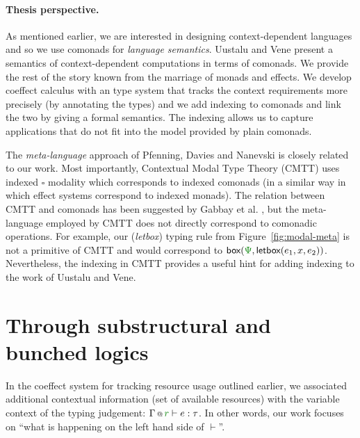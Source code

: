   
\paragraph{Thesis perspective.}
As mentioned earlier, we are interested in designing context-dependent languages and so we
use comonads for \emph{language semantics}. Uustalu and Vene present a semantics of 
context-dependent computations in terms of comonads. We provide the rest of the story known 
from the marriage of monads and effects. We develop coeffect calculus with an type system that 
tracks the context requirements more precisely (by annotating the types) and we add indexing 
to comonads and link the two by giving a formal semantics. The indexing allows us to capture 
applications that do not fit into the model provided by plain comonads.

The \emph{meta-language} approach of Pfenning, Davies and Nanevski is closely related to
our work. Most importantly, Contextual Modal Type Theory (CMTT) uses indexed $\square$ modality
which corresponds to indexed comonads (in a similar way in which effect systems correspond to 
indexed monads). The relation between CMTT and comonads has been suggested by
Gabbay et al. \cite{logic-cmtt-semantics}, but the meta-language employed by CMTT does not 
directly correspond to comonadic operations. For example, our (\emph{letbox}) typing rule from
Figure~\ref{fig:modal-meta} is not a primitive of CMTT and would correspond to 
$\ident{box}(\cclrd{\Psi}, \ident{letbox}(e_1, x, e_2))$. Nevertheless, the indexing in 
CMTT provides a useful hint for adding indexing to the work  of Uustalu and Vene.


\section{Through substructural and bunched logics}
\label{sec:path-logic}

In the coeffect system for tracking resource usage outlined earlier, we associated additional
contextual information (set of available resources) with the variable context of the typing 
judgement: $\coctx{\Gamma}{\cclrd{r}} \vdash e : \tau$. In other words, our work focuses on 
``what is happening on the left hand side of $\vdash$''.

